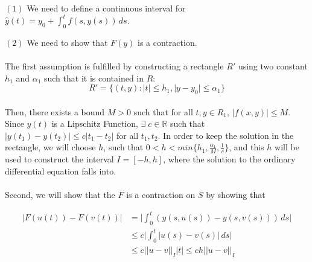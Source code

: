 \documentclass{article}
\theoremstyle{definition}
\theoremstyle{remark}
\begin{document}
$(1)$ We need to define a continuous interval for $\hat{y}(t) = y_0 + \int_{0}^{t}{f(s,y(s))}\,ds$.

$(2)$ We need to show that $F(y)$ is a contraction.

\paragraph{  }

The first assumption is fulfilled by constructing a rectangle $R'$ using two constant $h_1$ and $\alpha_1$ such that it is contained in $R$:
\begin{equation}\label{eqn:rect}
    R' = \{(t,y): \lvert t \rvert \leq h_1, \lvert y - y_0 \rvert \leq \alpha_1\}
\end{equation}

\paragraph{  }

Then, there exists a bound $M > 0$ such that for all $t, y \in R_1$, $\lvert f(x,y) \rvert \leq M$. Since $y(t)$ is a Lipschitz Function, $\exists \; c \in \mathbb{R}$ such that $\lvert y(t_1) - y(t_2) \rvert \leq c \lvert t_1 - t_2 \rvert$ for all $t_1, t_2$. In order to keep the solution in the rectangle, we will choose $h$, such that $0< h < min\{h_1,\tfrac{\alpha_1}{M}, \tfrac{1}{c}\}$, and this $h$ will be used to construct the interval $I = [-h,h]$, where the solution to the ordinary differential equation falls into.

\paragraph{  }

Second, we will show that the $F$ is a contraction on $S$ by showing that 

\begin{align}
        \lvert F(u(t)) - F(v(t)) \rvert & = \lvert \int_{0}^{t}{(y(s,u(s)) - y(s,v(s))) \,ds} \rvert\\
        & \leq c\lvert \int_{0}^{t}{\lvert u(s) - v(s) \rvert \,ds}\rvert\\
        & \leq c\lvert\lvert u - v \rvert\rvert_{I}\lvert t \rvert \leq ch\lvert\lvert u - v \rvert\rvert_{I}
\end{align}

\paragraph{  }
\end{document}
